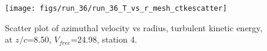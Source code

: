 \begin{figure}[H]
\centering
\texttt{[image: figs/run\_36/run\_36\_T\_vs\_r\_mesh\_ctkescatter]}
\caption{Scatter plot of azimuthal velocity vs radius, turbulent kinetic energy, at $z/c$=8.50, $V_{free}$=24.98, station 4.}
\label{fig:run_36_T_vs_r_mesh_ctkescatter}
\end{figure}


